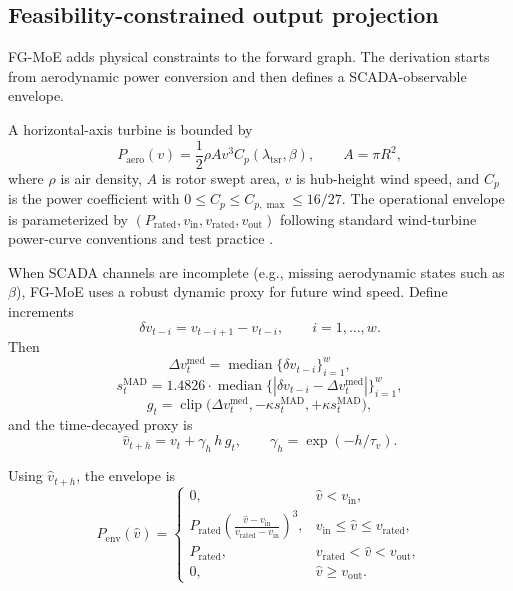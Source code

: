 \documentclass[review,1p,times]{elsarticle}
\begin{document}
\subsection{Feasibility-constrained output projection}
\label{sec:fg_moe}
FG-MoE adds physical constraints to the forward graph. The derivation starts from aerodynamic power conversion and then defines a SCADA-observable envelope.

A horizontal-axis turbine is bounded by
\begin{equation}
P_{\mathrm{aero}}(v)=\frac{1}{2}\rho A v^3 C_p(\lambda_{\mathrm{tsr}},\beta),\qquad A=\pi R^2,
\label{eq:fg_aero}
\end{equation}
where $\rho$ is air density, $A$ is rotor swept area, $v$ is hub-height wind speed, and $C_p$ is the power coefficient with $0\le C_p\le C_{p,\max}\le 16/27$. The operational envelope is parameterized by $(P_{\mathrm{rated}},v_{\mathrm{in}},v_{\mathrm{rated}},v_{\mathrm{out}})$ following standard wind-turbine power-curve conventions and test practice \citep{burton2011wind,iec61400_12_1_2017,martincalzada2025optimized}.

When SCADA channels are incomplete (e.g., missing aerodynamic states such as $\beta$), FG-MoE uses a robust dynamic proxy for future wind speed. Define increments
\begin{equation}
\delta v_{t-i}=v_{t-i+1}-v_{t-i},\qquad i=1,\ldots,w.
\label{eq:fg_proxy_diff}
\end{equation}
Then
\begin{equation}
\Delta v_t^{\mathrm{med}}=\operatorname{median}\!\big\{\delta v_{t-i}\big\}_{i=1}^{w},
\label{eq:fg_proxy_med_diff}
\end{equation}
\begin{equation}
s_t^{\mathrm{MAD}}=1.4826\cdot \operatorname{median}\!\big\{|\delta v_{t-i}-\Delta v_t^{\mathrm{med}}|\big\}_{i=1}^{w},
\label{eq:fg_proxy_mad_scale}
\end{equation}
\begin{equation}
g_t=\operatorname{clip}\!\Big(\Delta v_t^{\mathrm{med}},-\kappa s_t^{\mathrm{MAD}},+\kappa s_t^{\mathrm{MAD}}\Big),
\label{eq:fg_proxy_clip}
\end{equation}
and the time-decayed proxy is
\begin{equation}
\hat{v}_{t+h}=v_t + \gamma_h\, h\, g_t,\qquad
\gamma_h=\exp(-h/\tau_v).
\label{eq:fg_proxy_robust}
\end{equation}

Using $\hat v_{t+h}$, the envelope is
\begin{equation}
P_{\mathrm{env}}(\hat{v})=
\begin{cases}
0, & \hat{v}<v_{\mathrm{in}},\\[2pt]
P_{\mathrm{rated}}\left(\frac{\hat{v}-v_{\mathrm{in}}}{v_{\mathrm{rated}}-v_{\mathrm{in}}}\right)^3, & v_{\mathrm{in}}\le \hat{v}\le v_{\mathrm{rated}},\\[6pt]
P_{\mathrm{rated}}, & v_{\mathrm{rated}}<\hat{v}<v_{\mathrm{out}},\\[2pt]
0, & \hat{v}\ge v_{\mathrm{out}}.
\end{cases}
\label{eq:fg_env}
\end{equation}
\end{document}
